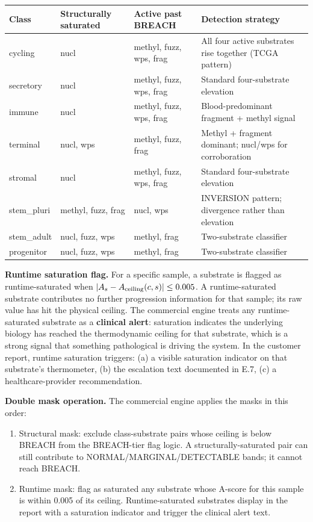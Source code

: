 \documentclass[12pt,a4paper]{article}
\begin{document}
\begin{center}
\renewcommand{\arraystretch}{1.15}
\footnotesize
\begin{tabular}{lllp{5.3cm}}
\toprule
\textbf{Class} & \textbf{Structurally saturated} & \textbf{Active past BREACH} & \textbf{Detection strategy} \\
\midrule
cycling    & nucl                  & methyl, fuzz, wps, frag     & All four active substrates rise together (TCGA pattern) \\
secretory  & nucl                  & methyl, fuzz, wps, frag     & Standard four-substrate elevation \\
immune     & nucl                  & methyl, fuzz, wps, frag     & Blood-predominant fragment + methyl signal \\
terminal   & nucl, wps             & methyl, fuzz, frag          & Methyl + fragment dominant; nucl/wps for corroboration \\
stromal    & nucl                  & methyl, fuzz, wps, frag     & Standard four-substrate elevation \\
stem\_pluri & methyl, fuzz, frag    & nucl, wps                   & INVERSION pattern; divergence rather than elevation \\
stem\_adult & nucl, fuzz, wps       & methyl, frag                & Two-substrate classifier \\
progenitor & nucl, fuzz, wps       & methyl, frag                & Two-substrate classifier \\
\bottomrule
\end{tabular}
\end{center}

\textbf{Runtime saturation flag.} For a specific sample, a substrate
is flagged as runtime-saturated when
$|A_s - A_{\rm ceiling}(c,s)| \leq 0.005$. A runtime-saturated substrate
contributes no further progression information for that sample; its
raw value has hit the physical ceiling. The commercial engine treats
any runtime-saturated substrate as a \textbf{clinical alert}: saturation
indicates the underlying biology has reached the thermodynamic ceiling
for that substrate, which is a strong signal that something pathological
is driving the system. In the customer report, runtime saturation
triggers: (a) a visible saturation indicator on that substrate's
thermometer, (b) the escalation text documented in E.7, (c) a
healthcare-provider recommendation.

\textbf{Double mask operation.} The commercial engine applies the masks
in this order:
\begin{enumerate}
\item Structural mask: exclude class-substrate pairs whose ceiling is
below BREACH from the BREACH-tier flag logic. A structurally-saturated
pair can still contribute to NORMAL/MARGINAL/DETECTABLE bands; it
cannot reach BREACH.
\item Runtime mask: flag as saturated any substrate whose A-score for
this sample is within 0.005 of its ceiling. Runtime-saturated
substrates display in the report with a saturation indicator and
trigger the clinical alert text.
\end{enumerate}
\end{document}
